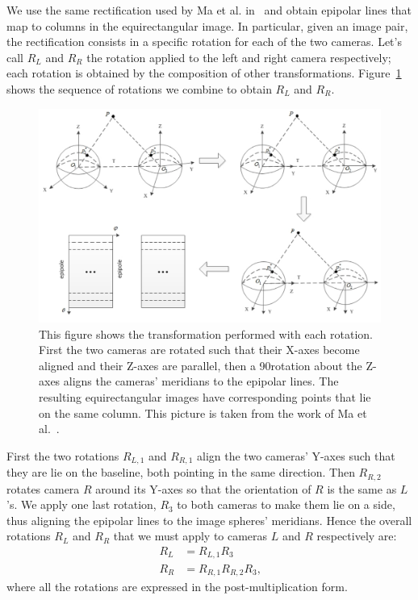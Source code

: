We use the same rectification used by Ma et al. in~\cite{ma20153d} and obtain
epipolar lines that map to columns in the equirectangular image.
In particular, given an image pair, the rectification consists in a specific
rotation for each of the two cameras. Let's call $R_L$ and $R_R$ the rotation
applied to the left and right camera respectively; each rotation is obtained
by the composition of other transformations. Figure~\ref{fig:rectification} shows
the sequence of rotations we combine to obtain $R_L$ and $R_R$.
%
\begin{figure}
\centering
\includegraphics[width=\linewidth]{img/rectification.png}
\caption{This figure shows the transformation performed with each rotation.
First the two cameras are rotated such that their X-axes become aligned and 
their Z-axes are parallel, then a 90\degree rotation about the Z-axes aligns
the cameras' meridians to the epipolar lines. The resulting equirectangular
images have corresponding points that lie on the same column.
This picture is taken from the work of Ma et al.~\cite{ma20153d}.}
\label{fig:rectification}
\end{figure}
%
First the two rotations $R_{L, 1}$ and $R_{R, 1}$ align the two cameras' Y-axes
such that they are lie on the baseline, both pointing in the same
direction. Then $R_{R, 2}$ rotates camera $R$ around its Y-axes so that
the orientation of $R$
is the same as $L$'s. We apply one last rotation, $R_3$ to both
cameras to make them lie on a side, thus aligning the epipolar lines to the
image spheres' meridians.
Hence the overall rotations $R_L$ and $R_R$ that we must apply to cameras $L$ and $R$
respectively are:
\begin{align}
	R_L &= R_{L, 1}R_3 \\
	R_R &= R_{R, 1}R_{R, 2}R_3	\text{,}
\end{align}
\noindent where all the rotations are expressed in the post-multiplication form.

